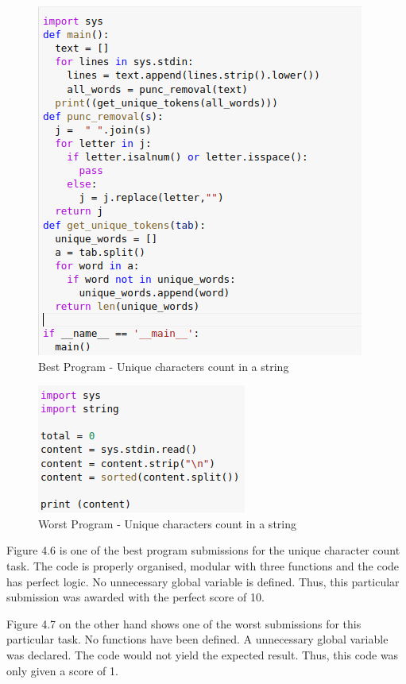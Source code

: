 \begin{figure}[h]
\centering
\includegraphics[scale = 1.1]{./figures/best_uc.png}
\caption{Best Program - Unique characters count in a string}
\label{fig1}
\end{figure}

\newpage

\begin{figure}[H]
\centering
\includegraphics[scale=1.2]{./figures/worst_uc.png}
\caption{Worst Program - Unique characters count in a string}
\label{fig1}
\end{figure}

Figure 4.6 is one of the best program submissions for the unique character count task. The code is properly organised, modular with three functions and the code has perfect logic. No unnecessary global variable is defined. Thus, this particular submission was awarded with the perfect score of 10.

Figure 4.7 on the other hand shows one of the worst submissions for this particular task. No functions have been defined. A unnecessary global variable was declared. The code would not yield the expected result. Thus, this code was only given a score of 1.

